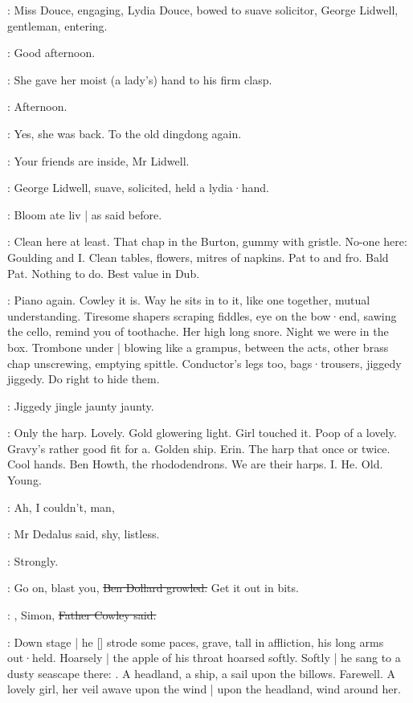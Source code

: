 :
Miss Douce,
engaging,
Lydia Douce,
bowed to suave solicitor,
George Lidwell,
gentleman,
entering.

\lidwell:
Good afternoon.

:
She gave her moist (a lady's) hand to his firm clasp.

\MissD:
Afternoon.

:
Yes,
she was back.
To the old dingdong again.

\MissD:
Your friends are inside,
Mr Lidwell.

:
George Lidwell,
suave,
solicited,
held a lydia·hand.

:
Bloom ate liv |
as said before.

\BloomIntA:
Clean here at least.
That chap in the Burton,
gummy with gristle.
No-one here:
Goulding and I\@.
Clean tables,
flowers,
mitres of napkins.
Pat to and fro.
Bald Pat.
Nothing to do.
Best value in Dub.

\BloomIntB:
Piano again.
Cowley it is.
Way he sits in to it,
like one together,
mutual understanding.
Tiresome shapers scraping fiddles,
eye on the bow·end,
sawing the cello,
remind you of toothache.
Her high long snore.
Night we were in the box.
Trombone under |
blowing like a grampus,
between the acts,
other brass chap unscrewing,
emptying spittle.
Conductor's legs too,
bags·trousers,
jiggedy jiggedy.
Do right to hide them.

:
Jiggedy jingle jaunty jaunty.

\BloomIntB:
Only the harp.
Lovely.
Gold glowering light.
Girl touched it.
Poop of a lovely.
Gravy's rather good fit for a.
Golden ship.
Erin.
The harp that
once or twice.
Cool hands.
Ben Howth,
the rhododendrons.
We are their harps.
I\@.
He.
Old.
Young.

\simon:
Ah,
I couldn't,
man,

:
Mr Dedalus said,
shy,
listless.

:
Strongly.

\dollard:
Go on,
blast you,
\sout{Ben Dollard growled.}
Get it out in bits.

\cowley:
,
Simon,
\sout{Father Cowley said.}

:
Down stage |
he [] strode some paces,
grave,
tall in affliction,
his long arms out·held.
Hoarsely |
the apple of his throat hoarsed softly.
Softly |
he sang to a dusty seascape there:
.
A headland,
a ship,
a sail upon the billows.
Farewell.
A lovely girl,
her veil awave upon the wind |
upon the headland,
wind around her.

